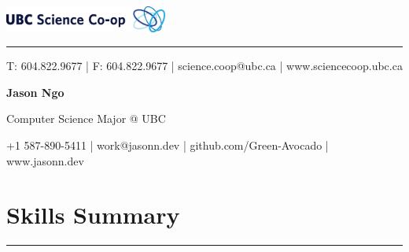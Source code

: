 \documentclass[letterpaper]{article}
\newcommand{\sect}[1]{\section*{#1}
                        {\color{cyan}
                        \rule{\textwidth}{1pt}
                        \vspace{-1ex}}}
\begin{document}
    \begin{flushright}
        \includegraphics[width=0.4\textwidth]{ScienceCo-opLogo_UBC_H.eps}
    \end{flushright}

    \vspace{-2ex}
    \begin{minipage}{\dimexpr(\textwidth-56pt)}
        \begin{flushright}
        {\color{ubclightblue}\rule{\textwidth}{0.5pt}}

        {\small\color{ubcblue}
          T: 604.822.9677
        | F: 604.822.9677
        | science.coop@ubc.ca
        | www.sciencecoop.ubc.ca}
        \end{flushright}
    \end{minipage}

    {\Huge
    \textbf{Jason Ngo}}

    \vspace{1ex}
    {\large
    Computer Science Major @ UBC}

    {\small
      +1 587-890-5411
    | work@jasonn.dev
    | github.com/Green-Avocado
    | www.jasonn.dev
    }
    \vspace{1ex}

    \setlength{\parskip}{-3pt}

    \sect{Skills Summary}
\end{document}
